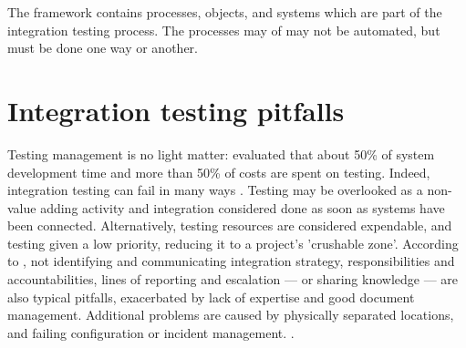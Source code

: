 \documentclass[12pt,a4paper,oneside,pdftex]{report}
\begin{document}
The framework contains processes, objects, and systems which are part of the integration testing process. The processes may of may not be automated, but must be done one way or another.


\section{Integration testing pitfalls}
\label{section:pitfalls}

Testing management is no light matter: \citet{reid2005art} evaluated that about 50\% of system development time and more than 50\% of costs are spent on testing. Indeed, integration testing can fail in many ways \citep{van2008identifying}. Testing may be overlooked as a non-value adding activity and integration considered done as soon as systems have been connected. Alternatively, testing resources are considered expendable, and testing given a low priority, reducing it to a project's 'crushable zone'. According to \citet{van2008identifying}, not identifying and communicating integration strategy, responsibilities and accountabilities, lines of reporting and escalation --- or sharing knowledge --- are also typical pitfalls, exacerbated by lack of expertise and good document management. Additional problems are caused by physically separated locations, and failing configuration or incident management. \citep{van2008identifying}.
\end{document}
